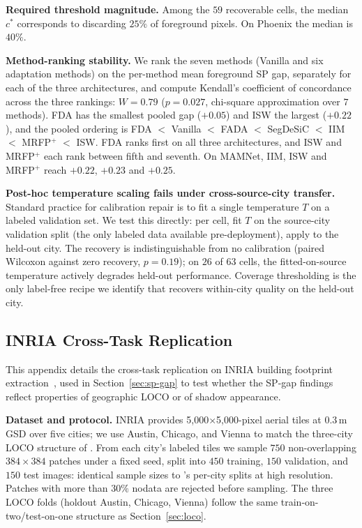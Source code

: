 \textbf{Required threshold magnitude.} Among the $59$ recoverable cells, the median $c^*$ corresponds to discarding $25\%$ of foreground pixels. On Phoenix the median is $40\%$.

\textbf{Method-ranking stability.} We rank the seven methods (Vanilla and six adaptation methods) on the per-method mean foreground SP gap, separately for each of the three architectures, and compute Kendall's coefficient of concordance across the three rankings: $W = 0.79$ ($p = 0.027$, chi-square approximation over $7$ methods). FDA has the smallest pooled gap ($+0.05$) and ISW the largest ($+0.22$), and the pooled ordering is FDA $<$ Vanilla $<$ FADA $<$ SegDeSiC $<$ IIM $<$ MRFP$^+$ $<$ ISW. FDA ranks first on all three architectures, and ISW and MRFP$^+$ each rank between fifth and seventh. On MAMNet, IIM, ISW and MRFP$^+$ reach $+0.22$, $+0.23$ and $+0.25$.

\textbf{Post-hoc temperature scaling fails under cross-source-city transfer.} Standard practice for calibration repair is to fit a single temperature $T$ on a labeled validation set. We test this directly: per cell, fit $T$ on the source-city validation split (the only labeled data available pre-deployment), apply to the held-out city. The recovery is indistinguishable from no calibration (paired Wilcoxon against zero recovery, $p = 0.19$); on $26$ of $63$ cells, the fitted-on-source temperature actively degrades held-out performance. Coverage thresholding is the only label-free recipe we identify that recovers within-city quality on the held-out city.

\subsection{INRIA Cross-Task Replication}
\label{app:inria}

This appendix details the cross-task replication on INRIA building footprint extraction~\cite{inria}, used in Section~\ref{sec:sp-gap} to test whether the SP-gap findings reflect properties of geographic LOCO or of shadow appearance.

\textbf{Dataset and protocol.} INRIA provides 5{,}000$\times$5{,}000-pixel aerial tiles at $0.3$\,m GSD over five cities; we use Austin, Chicago, and Vienna to match the three-city LOCO structure of \shadow. From each city's labeled tiles we sample $750$ non-overlapping $384\times384$ patches under a fixed seed, split into $450$ training, $150$ validation, and $150$ test images: identical sample sizes to \shadow's per-city splits at high resolution. Patches with more than $30\%$ nodata are rejected before sampling. The three LOCO folds (holdout Austin, Chicago, Vienna) follow the same train-on-two/test-on-one structure as Section~\ref{sec:loco}.

